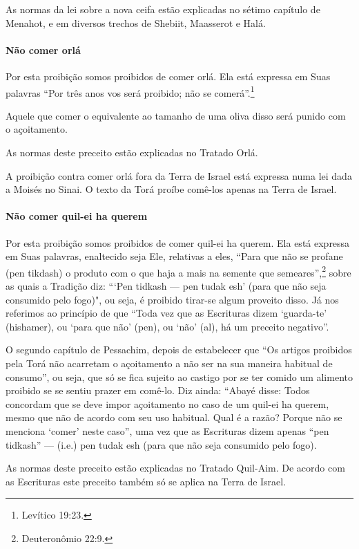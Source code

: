 As normas da lei sobre a nova ceifa estão explicadas no sétimo capítulo
de Menahot, e em diversos trechos de Shebiit, Maasserot e Halá.

\paragraph{Não comer orlá}

Por esta proibição somos proibidos de comer orlá. Ela está expressa
em Suas palavras ``Por três anos vos será proibido; não se comerá''.\footnote{Levítico 19:23.}

Aquele que comer o equivalente ao tamanho de uma oliva disso será punido
com o açoitamento.

As normas deste preceito estão explicadas no Tratado Orlá.

A proibição contra comer orlá fora da Terra de Israel está expressa
numa lei dada a Moisés no Sinai. O texto da Torá proíbe comê-los apenas
na Terra de Israel.

\paragraph{Não comer quil-ei ha querem}

Por esta proibição somos proibidos de comer quil-ei ha querem. Ela
está expressa em Suas palavras, enaltecido seja Ele, relativas a eles,
``Para que não se profane (pen tikdash) o produto com o que haja a mais
na semente que semeares'',\footnote{Deuteronômio 22:9.} sobre as quais a Tradição
diz: ```Pen tidkash --- pen tudak esh' (para que não seja consumido
pelo fogo)", ou seja, é proibido tirar-se algum proveito disso. Já nos
referimos ao princípio de que ``Toda vez que as Escrituras dizem
`guarda-te' (hishamer), ou `para que não' (pen), ou `não' (al), há um
preceito negativo''.

O segundo capítulo de Pessachim, depois de estabelecer que ``Os artigos
proibidos pela Torá não acarretam o açoitamento a não ser na sua
maneira habitual de consumo'', ou seja, que só se fica sujeito ao
castigo por se ter comido um alimento proibido se se sentiu prazer em
comê-lo. Diz ainda: ``Abayé disse: Todos concordam que se deve impor
açoitamento no caso de um quil-ei ha querem, mesmo que não de acordo
com seu uso habitual. Qual é a razão? Porque não se menciona `comer'
neste caso'', uma vez que as Escrituras dizem apenas ``pen tidkash''
--- (i.e.) pen tudak esh (para que não seja consumido pelo fogo).

As normas deste preceito estão explicadas no Tratado Quil-Aim. De acordo
com as Escrituras este preceito também só se aplica na Terra de Israel.

